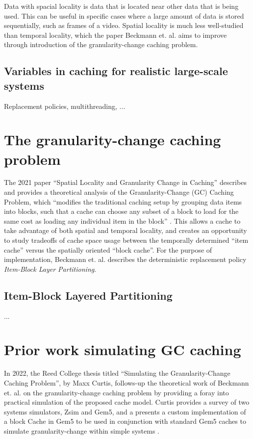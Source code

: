 \documentclass[12pt,twoside]{reedthesis}
\begin{document}
	Data with spacial locality is data that is located near other data that is being used. This can be useful in specific cases where a large amount of data is stored sequentially, such as frames of a video. Spatial locality is much less well-studied than temporal locality, which the paper Beckmann et. al. aims to improve through introduction of the granularity-change caching problem.

	\subsection*{Variables in caching for realistic large-scale systems}
	Replacement policies, multithreading, ...

\section{The granularity-change caching problem}
The 2021 paper ``Spatial Locality and Granularity Change in Caching'' describes and provides a theoretical analysis of the Granularity-Change (GC) Caching Problem, which ``modifies the traditional caching setup by grouping data items into blocks, such that a cache can choose any subset of a block to load for the same cost as loading any individual item in the block'' \cite{beckmann}. This allows a cache to take advantage of both spatial and temporal locality, and creates an opportunity to study tradeoffs of cache space usage between the temporally determined ``item cache'' versus the spatially oriented ``block cache''. For the purpose of implementation, Beckmann et. al. describes the deterministic replacement policy \textit{Item-Block Layer Partitioning}.

	\subsection*{Item-Block Layered Partitioning}
	...

\section{Prior work simulating GC caching}
In 2022, the Reed College thesis titled ``Simulating the Granularity-Change Caching Problem'', by Maxx Curtis, follows-up the theoretical work of Beckmann et. al. on the granularity-change caching problem by providing a foray into practical simulation of the proposed cache model. Curtis provides a survey of two systems simulators, Zsim and Gem5, and a presents a custom implementation of a block Cache in Gem5 to be used in conjunction with standard Gem5 caches to simulate granularity-change within simple systems \cite{curtis}.
\end{document}
